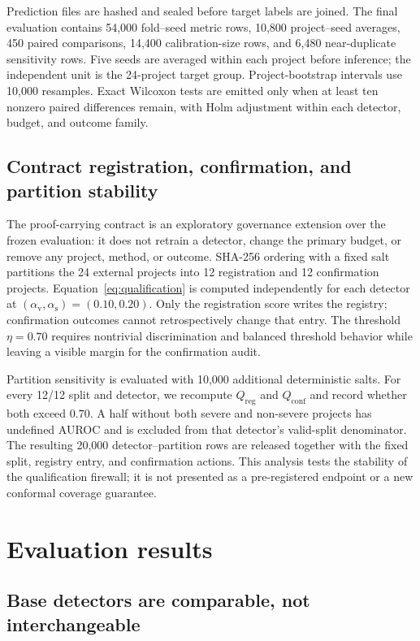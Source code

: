 \documentclass[preprint,12pt]{elsarticle}
\newcommand{\av}{\alpha_{\mathrm{v}}}
\newcommand{\as}{\alpha_{\mathrm{s}}}
\begin{document}
Prediction files are hashed and sealed before target labels are joined. The final evaluation contains 54,000 fold--seed metric rows, 10,800 project--seed averages, 450 paired comparisons, 14,400 calibration-size rows, and 6,480 near-duplicate sensitivity rows. Five seeds are averaged within each project before inference; the independent unit is the 24-project target group. Project-bootstrap intervals use 10,000 resamples. Exact Wilcoxon tests are emitted only when at least ten nonzero paired differences remain, with Holm adjustment within each detector, budget, and outcome family.

\subsection{Contract registration, confirmation, and partition stability}

The proof-carrying contract is an exploratory governance extension over the frozen evaluation: it does not retrain a detector, change the primary budget, or remove any project, method, or outcome. SHA-256 ordering with a fixed salt partitions the 24 external projects into 12 registration and 12 confirmation projects. Equation~\eqref{eq:qualification} is computed independently for each detector at $(\av,\as)=(0.10,0.20)$. Only the registration score writes the registry; confirmation outcomes cannot retrospectively change that entry. The threshold $\eta=0.70$ requires nontrivial discrimination and balanced threshold behavior while leaving a visible margin for the confirmation audit.

Partition sensitivity is evaluated with 10,000 additional deterministic salts. For every 12/12 split and detector, we recompute $Q_{\mathrm{reg}}$ and $Q_{\mathrm{conf}}$ and record whether both exceed $0.70$. A half without both severe and non-severe projects has undefined AUROC and is excluded from that detector's valid-split denominator. The resulting 20,000 detector--partition rows are released together with the fixed split, registry entry, and confirmation actions. This analysis tests the stability of the qualification firewall; it is not presented as a pre-registered endpoint or a new conformal coverage guarantee.

\section{Evaluation results}

\subsection{Base detectors are comparable, not interchangeable}
\end{document}
